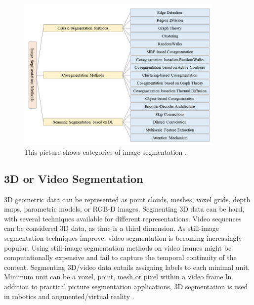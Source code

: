  
\begin{figure}[H]
  \centering
  \includegraphics[width=0.9\textwidth]{Figures/categories of image segmentation method.PNG}
  \caption[Illustration of categories of image segmentation ]{This picture shows categories of image segmentation \cite{yu2023techniques}.}
  \label{fig:Categories of Image segmentation}
\end{figure}

\subsection{3D or Video Segmentation}
3D geometric data can be represented as point clouds, meshes, voxel grids, depth maps, parametric models, or RGB-D images. Segmenting 3D data can be hard, with several techniques available for different representations. Video sequences can be considered 3D data, as time is a third dimension. As still-image segmentation techniques improve, video segmentation is becoming increasingly popular.
Using still-image segmentation methods on video frames might be computationally expensive and fail to capture the temporal continuity of the content. Segmenting 3D/video data entails assigning labels to each minimal unit. Minimum unit can be a voxel, point, mesh or pixel within a video frame.In addition to practical picture segmentation applications, 3D segmentation is used in robotics and augmented/virtual reality \cite{wang2022comprehensive}. 





